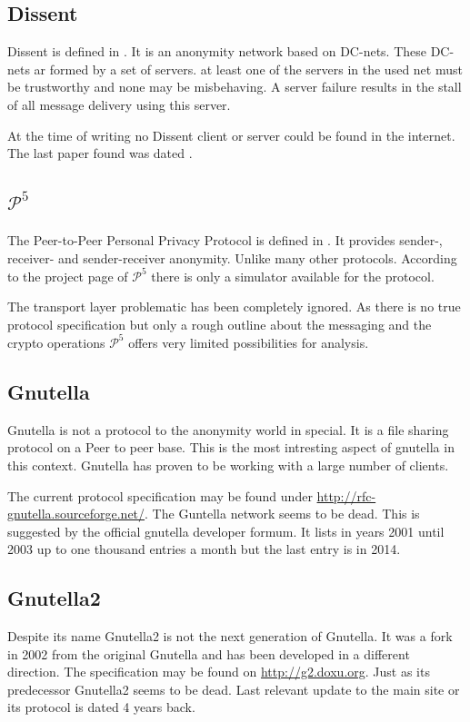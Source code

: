 \subsection{Dissent}
Dissent is defined in \cite{Corrigan-Gibbs:2010:DAA:1866307.1866346}. It is an anonymity network based on DC-nets. These DC-nets ar formed by a set of servers. at least one of the servers in the used net must be trustworthy and none may be misbehaving. A server failure results in the stall of all message delivery using this server.

At the time of writing no Dissent client or server could be found in the internet. The last paper\cite{wolinsky2012dissent} found was dated \citeyear{wolinsky2012dissent}.

\subsection{$\mathcal{P}^5$}
The Peer-to-Peer Personal Privacy Protocol is defined in \cite{sherwood-protocol}. It provides sender-, receiver- and sender-receiver anonymity. Unlike many other protocols. According to the project page of $\mathcal{P}^5$ there is only a simulator available for the protocol.

The transport layer problematic has been completely ignored. As there is no true protocol specification but only a rough outline about the messaging and the crypto operations $\mathcal{P}^5$ offers very limited possibilities for analysis.

\subsection{Gnutella}
Gnutella is not a protocol to the anonymity world in special. It is a file sharing protocol on a Peer to peer base. This is the most intresting aspect of gnutella in this context. Gnutella has proven to be working with a large number of clients.

The current protocol specification may be found under \href{http://rfc-gnutella.sourceforge.net/developer/stable/index.html}{http://rfc-gnutella.sourceforge.net/}. The Guntella network seems to be dead. This is suggested by the official gnutella developer formum. It lists in years 2001 until 2003 up to one thousand entries a month but the last entry is in 2014.

\subsection{Gnutella2}
Despite its name Gnutella2 is not the next generation of Gnutella. It was a fork in 2002 from the original Gnutella and has been developed in a different direction. The specification may be found on \href{http://g2.doxu.org}{http://g2.doxu.org}. Just as its predecessor Gnutella2 seems to be dead. Last relevant update to the main site or its protocol is dated 4 years back.

